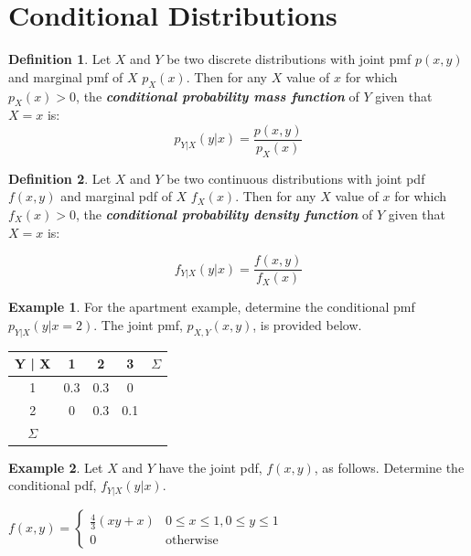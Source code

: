 \documentclass[
  11pt,
  oneside]{book}
\theoremstyle{definition}
\newtheorem{definition}{Definition}[chapter]
\theoremstyle{definition}
\newtheorem{example}{Example}[chapter]
\theoremstyle{definition}
\theoremstyle{definition}
\theoremstyle{remark}
\begin{document}
\vfill

\newpage

\section{Conditional Distributions}\label{conditional-distributions}

\begin{definition}
Let \(X\) and \(Y\) be two discrete distributions with joint pmf \(p(x,y)\) and marginal pmf of \(X\) \(p_X(x)\). Then for any \(X\) value of \(x\) for which \(p_X(x) > 0\), the \textbf{\emph{conditional probability mass function}} of \(Y\) given that \(X=x\) is:
\[p_{Y|X}(y|x) = \frac{p(x,y)}{p_X(x)} \]
\end{definition}

\begin{definition}
Let \(X\) and \(Y\) be two continuous distributions with joint pdf \(f(x,y)\) and marginal pdf of \(X\) \(f_X(x)\). Then for any \(X\) value of \(x\) for which \(f_X(x) > 0\), the \textbf{\emph{conditional probability density function}} of \(Y\) given that \(X=x\) is:

\[f_{Y|X}(y|x) = \frac{f(x,y)}{f_X(x)} \]
\end{definition}

\begin{example}

For the apartment example, determine the conditional pmf \(p_{Y|X}(y|x=2)\). The joint pmf, \(p_{X,Y}(x,y)\), is provided below.

\begin{table}[!h]
\centering
\begin{tabular}{c|c|c|c|c}
\hline
Y | X & 1 & 2 & 3 & $\Sigma$\\
\hline
1 & 0.3 & 0.3 & 0 & \\
\hline
2 & 0 & 0.3 & 0.1 & \\
\hline
$\Sigma$ &  &  &  & \\
\hline
\end{tabular}
\end{table}

\end{example}

\vfill

\begin{example}
Let \(X\) and \(Y\) have the joint pdf, \(f(x,y)\), as follows. Determine the conditional pdf, \(f_{Y|X}(y|x)\).
\end{example}

\(f(x,y) = \begin{cases} \frac{4}{3}(xy + x) & 0 \leq x \leq 1, 0 \leq y \leq 1\\
0 & \text{otherwise}
\end{cases}\)
\end{document}
